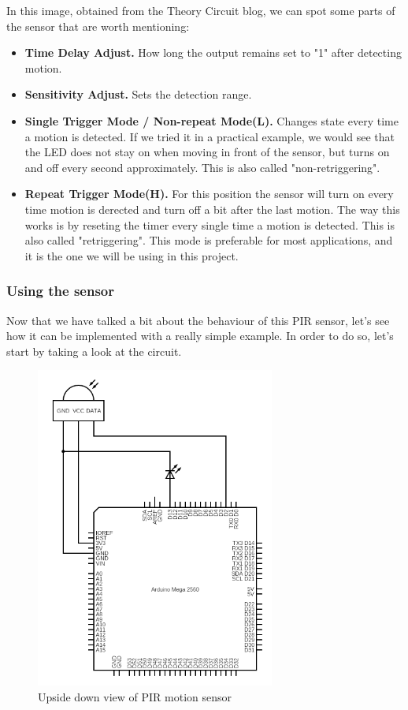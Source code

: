 In this image, obtained from the Theory Circuit\cite{theory-circuit} blog, we can spot some parts of the sensor that are worth mentioning:

\begin{itemize}
	\item \textbf{Time Delay Adjust.} How long the output remains set to "1" after detecting motion.
	\item \textbf{Sensitivity Adjust.} Sets the detection range.
	\item \textbf{Single Trigger Mode / Non-repeat Mode(L).} Changes state every time a motion is detected. If we tried it in a practical example, we would see that the LED does not stay on when moving in front of the sensor, but turns on and off every second approximately. This is also called "non-retriggering". 
	\item \textbf{Repeat Trigger Mode(H).} For this position the sensor will turn on every time motion is derected and turn off a bit after the last motion. The way this works is by reseting the timer every single time a motion is detected. This is also called "retriggering". This mode is preferable for most applications, and it is the one we will be using in this project.
\end{itemize}

\vspace{5mm}
\subsubsection{Using the sensor}
Now that we have talked a bit about the behaviour of this PIR sensor, let's see how it can be implemented with a really simple example. In order to do so, let's start by taking a look at the circuit.

\begin{figure}[H]
    \centering
    \includegraphics[width=0.7\textwidth]{fig/pir-scheme-circuit.png}
    \caption{Upside down view of PIR motion sensor}
    \label{fig:pir-scheme-circuit}
\end{figure}

